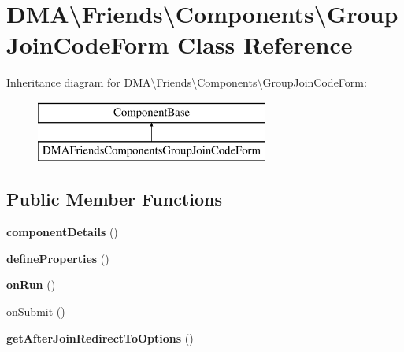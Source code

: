 \hypertarget{classDMA_1_1Friends_1_1Components_1_1GroupJoinCodeForm}{}\section{D\+M\+A\textbackslash{}Friends\textbackslash{}Components\textbackslash{}Group\+Join\+Code\+Form Class Reference}
\label{classDMA_1_1Friends_1_1Components_1_1GroupJoinCodeForm}
Inheritance diagram for D\+M\+A\textbackslash{}Friends\textbackslash{}Components\textbackslash{}Group\+Join\+Code\+Form\+:\begin{figure}[H]
\begin{center}
\leavevmode
\includegraphics[height=2.000000cm]{d7/df7/classDMA_1_1Friends_1_1Components_1_1GroupJoinCodeForm}
\end{center}
\end{figure}
\subsection*{Public Member Functions}
\begin{DoxyCompactItemize}
\item 
\hypertarget{classDMA_1_1Friends_1_1Components_1_1GroupJoinCodeForm_aa62dbdb4806954432078c3c6635f22e5}{}{\bfseries component\+Details} ()\label{classDMA_1_1Friends_1_1Components_1_1GroupJoinCodeForm_aa62dbdb4806954432078c3c6635f22e5}

\item 
\hypertarget{classDMA_1_1Friends_1_1Components_1_1GroupJoinCodeForm_acfef6b12de7d979e4cf929d350b3a743}{}{\bfseries define\+Properties} ()\label{classDMA_1_1Friends_1_1Components_1_1GroupJoinCodeForm_acfef6b12de7d979e4cf929d350b3a743}

\item 
\hypertarget{classDMA_1_1Friends_1_1Components_1_1GroupJoinCodeForm_ad2edc54525f331f6d2005605386a7cdd}{}{\bfseries on\+Run} ()\label{classDMA_1_1Friends_1_1Components_1_1GroupJoinCodeForm_ad2edc54525f331f6d2005605386a7cdd}

\item 
\hyperlink{classDMA_1_1Friends_1_1Components_1_1GroupJoinCodeForm_a973e8781fba9d6310f07af9463fa8c58}{on\+Submit} ()
\item 
\hypertarget{classDMA_1_1Friends_1_1Components_1_1GroupJoinCodeForm_a7247cfd0d7c04daa51168c954522ef7c}{}{\bfseries get\+After\+Join\+Redirect\+To\+Options} ()\label{classDMA_1_1Friends_1_1Components_1_1GroupJoinCodeForm_a7247cfd0d7c04daa51168c954522ef7c}

\end{DoxyCompactItemize}
